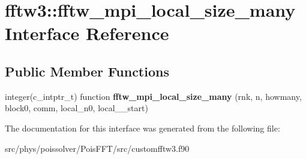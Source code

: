 \hypertarget{interfacefftw3_1_1fftw__mpi__local__size__many}{}\section{fftw3\+:\+:fftw\+\_\+mpi\+\_\+local\+\_\+size\+\_\+many Interface Reference}
\label{interfacefftw3_1_1fftw__mpi__local__size__many}
\subsection*{Public Member Functions}
\begin{DoxyCompactItemize}
\item 
integer(c\+\_\+intptr\+\_\+t) function {\bfseries fftw\+\_\+mpi\+\_\+local\+\_\+size\+\_\+many} (rnk, n, howmany, block0, comm, local\+\_\+n0, local\+\_\+\_\+start)\hypertarget{interfacefftw3_1_1fftw__mpi__local__size__many_a50ecb105d984d1c52ebaf395befd5921}{}\label{interfacefftw3_1_1fftw__mpi__local__size__many_a50ecb105d984d1c52ebaf395befd5921}

\end{DoxyCompactItemize}


The documentation for this interface was generated from the following file\+:\begin{DoxyCompactItemize}
\item 
src/phys/poissolver/\+Pois\+F\+F\+T/src/customfftw3.\+f90\end{DoxyCompactItemize}
